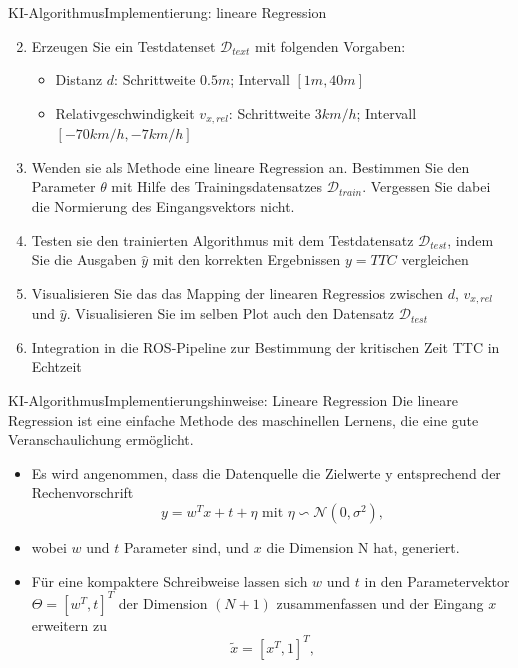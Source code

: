 \documentclass[169, handout	]{THIbeamer} %
\begin{document}
	\begin{frame}{KI-Algorithmus}{Implementierung: lineare Regression}
		\begin{enumerate}
			\setcounter{enumi}{1}
			\item Erzeugen Sie ein Testdatenset $\mathcal{D}_{text}$ mit folgenden Vorgaben:
			\begin{itemize}
				\item Distanz $d$: Schrittweite $0.5m$; Intervall $[1m, 40m]$ 
				\item Relativgeschwindigkeit $v_{x,rel}$: Schrittweite $3 km/h$; Intervall $[-70 km/h, -7 km/h]$
			\end{itemize}
			\item Wenden sie als Methode eine lineare Regression an. Bestimmen Sie den Parameter $\theta$ mit Hilfe des Trainingsdatensatzes $\mathcal{D}_{train}$. Vergessen Sie dabei die Normierung des Eingangsvektors nicht.
			\item Testen sie den trainierten Algorithmus mit dem Testdatensatz $\mathcal{D}_{test}$, indem Sie die Ausgaben $\hat{y}$ mit den korrekten Ergebnissen $y = TTC$ vergleichen
			\item Visualisieren Sie das das Mapping der linearen Regressios zwischen $d$, $v_{x,rel}$ und $\hat{y}$. Visualisieren Sie im selben Plot auch den Datensatz $\mathcal{D}_{test}$
			\item Integration in die ROS-Pipeline zur Bestimmung der kritischen Zeit TTC in Echtzeit
		\end{enumerate}
	\end{frame}
	\begin{frame}{KI-Algorithmus}{Implementierungshinweise: Lineare Regression}
		Die lineare Regression ist eine einfache Methode des maschinellen Lernens, die eine gute Veranschaulichung ermöglicht.
		\begin{itemize}
			\item Es wird angenommen, dass die Datenquelle die Zielwerte y entsprechend der Rechenvorschrift
			\begin{equation}
				y = w^T x + t + \eta \text{ mit } \eta \backsim \mathcal{N}(0, \sigma^2) \text{,}
			\end{equation}
			\item[] wobei $w$ und $t$ Parameter sind, und $x$ die Dimension N hat, generiert.
			\item Für eine kompaktere Schreibweise lassen sich $w$ und $t$ in den Parametervektor $\Theta = [w^T, t]^T$ der Dimension $(N+1)$ zusammenfassen und der Eingang $x$ erweitern zu 
			\begin{equation}
				\tilde{x} = [x^T, 1]^T \text{,}
			\end{equation}			   
		\end{itemize}
		
	\end{frame}
\end{document}
